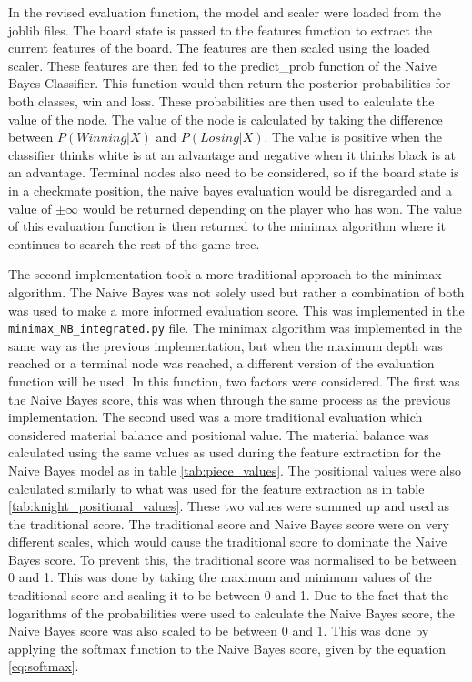 In the revised evaluation function, the model and scaler were loaded from the joblib files. The board state is passed to the features function to extract the current features of the board. The features are then scaled using the loaded scaler. These features are then fed to the predict\_prob function of the Naive Bayes Classifier. This function would then return the posterior probabilities for both classes, win and loss. These probabilities are then used to calculate the value of the node. The value of the node is calculated by taking the difference between $P(Winning | X)$ and $P(Losing | X)$. The value is positive when the classifier thinks white is at an advantage and negative when it thinks black is at an advantage. Terminal nodes also need to be considered, so if the board state is in a checkmate position, the naive bayes evaluation would be disregarded and a value of $\pm \infty$ would be returned depending on the player who has won. The value of this evaluation function is then returned to the minimax algorithm where it continues to search the rest of the game tree. 

The second implementation took a more traditional approach to the minimax algorithm. The Naive Bayes was not solely used but rather a combination of both was used to make a more informed evaluation score. This was implemented in the \texttt{minimax\_NB\_integrated.py} file. The minimax algorithm was implemented in the same way as the previous implementation, but when the maximum depth was reached or a terminal node was reached, a different version of the evaluation function will be used. In this function, two factors were considered. The first was the Naive Bayes score, this was when through the same process as the previous implementation. The second used was a more traditional evaluation which considered material balance and positional value. The material balance was calculated using the same values as used during the feature extraction for the Naive Bayes model as in table \ref{tab:piece_values}. The positional values were also calculated similarly to what was used for the feature extraction as in table \ref{tab:knight_positional_values}. These two values were summed up and used as the traditional score. The traditional score and Naive Bayes score were on very different scales, which would cause the traditional score to dominate the Naive Bayes score. To prevent this, the traditional score was normalised to be between 0 and 1. This was done by taking the maximum and minimum values of the traditional score and scaling it to be between 0 and 1. Due to the fact that the logarithms of the probabilities were used to calculate the Naive Bayes score, the Naive Bayes score was also scaled to be between 0 and 1. This was done by applying the softmax function to the Naive Bayes score, given by the equation \ref{eq:softmax}. 


